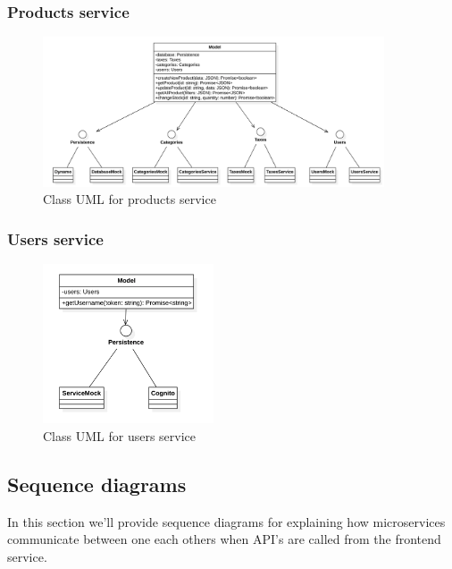 \subsubsection{Products service}
\begin{figure}[H]
    \includegraphics[width=0.9\textwidth]{res/images/class-diagrams/products.png}
    \caption{Class UML for products service}
\end{figure}

\subsubsection{Users service}
\begin{figure}[H]
    \includegraphics[width=0.45\textwidth]{res/images/class-diagrams/users.png}
    \caption{Class UML for users service}
\end{figure}


\subsection{Sequence diagrams} \label{_sequenceDiagram}
In this section we'll provide sequence diagrams for explaining how microservices communicate between one each others when API's are called from the frontend service.

